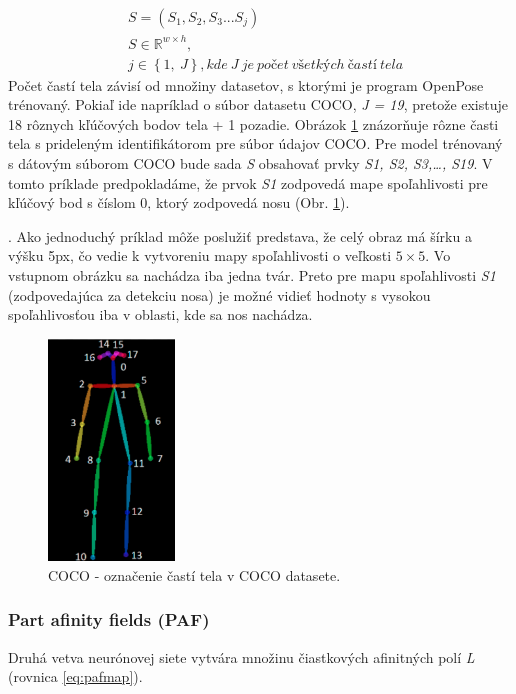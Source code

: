 \documentclass[slovak,master,dept460,male,cpp,cpdeclaration]{diploma}
\begin{document}
\begin{eqnarray}
& S = (S_{1}, S_{2}, S_{3} ... S_{j}) \label{eq:confidencemap}\\
& S\in\mathbb{R}^{w \times  h},\nonumber\\
& j\in \left \{1,\: J  \right \}, kde\: J\: je\: počet\: všetkých\: častí\: tela\nonumber
\end{eqnarray}
Počet častí tela závisí od množiny datasetov, s ktorými je program OpenPose trénovaný. Pokiaľ ide napríklad o súbor datasetu COCO\cite{lin2014microsoft}, \textit{J = 19}, pretože existuje 18 rôznych kľúčových bodov tela + 1 pozadie. Obrázok \ref{fig:cocoDataset} znázorňuje rôzne časti tela s prideleným identifikátorom pre súbor údajov COCO. Pre model trénovaný s dátovým súborom COCO bude sada \textit{S} obsahovať prvky \textit{S1, S2, S3,…, S19}. V tomto príklade predpokladáme, že prvok \textit{S1} zodpovedá mape spoľahlivosti pre kľúčový bod s číslom 0, ktorý zodpovedá nosu (Obr. \ref{fig:cocoDataset}).\par. Ako jednoduchý príklad môže poslužiť predstava, že celý obraz má šírku a výšku 5px, čo vedie k vytvoreniu  mapy spoľahlivosti o veľkosti \textit{$5\times 5$}. Vo vstupnom obrázku sa nachádza iba jedna tvár. Preto pre mapu spoľahlivosti \textit{S1} (zodpovedajúca za detekciu nosa) je možné vidieť hodnoty s vysokou spoľahlivosťou iba v oblasti, kde sa nos nachádza.\bigskip

\begin{figure}[H]
	\centering
	\includegraphics[width=0.3\textwidth]{Figures/cocoDataset.png}
	\caption{COCO - označenie častí tela v COCO datasete.\cite{cocoDataset}}
	\label{fig:cocoDataset}
\end{figure}


\subsubsection{Part afinity fields (PAF)}
Druhá vetva neurónovej siete vytvára množinu čiastkových afinitných polí \textit{L} (rovnica \ref{eq:pafmap}).
\end{document}
